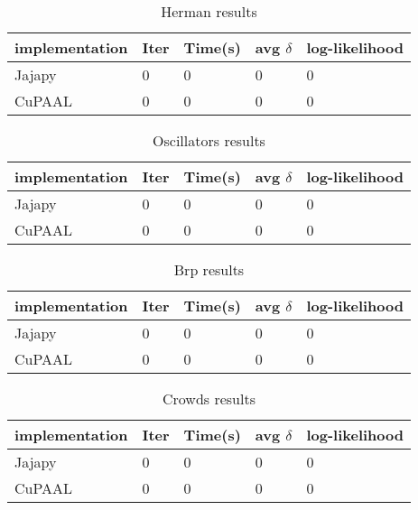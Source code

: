 \begin{table}[!htb]
    \centering
    \caption{Herman results}
    \label{tab:herman_results}
    \begin{tabular}{lllll}
        \toprule
        implementation & Iter & Time(s) & avg $\delta$ & log-likelihood \\
        \midrule
        Jajapy         & 0    & 0       & 0            & 0              \\
        CuPAAL         & 0    & 0       & 0            & 0              \\
        \bottomrule
    \end{tabular}
\end{table}

\begin{table}[!htb]
    \centering
    \caption{Oscillators results}
    \label{tab:oscillators_results}
    \begin{tabular}{lllll}
        \toprule
        implementation & Iter & Time(s) & avg $\delta$ & log-likelihood \\
        \midrule
        Jajapy         & 0    & 0       & 0            & 0              \\
        CuPAAL         & 0    & 0       & 0            & 0              \\
        \bottomrule
    \end{tabular}
\end{table}

\begin{table}[!htb]
    \centering
    \caption{Brp results}
    \label{tab:brp_results}
    \begin{tabular}{lllll}
        \toprule
        implementation & Iter & Time(s) & avg $\delta$ & log-likelihood \\
        \midrule
        Jajapy         & 0    & 0       & 0            & 0              \\
        CuPAAL         & 0    & 0       & 0            & 0              \\
        \bottomrule
    \end{tabular}
\end{table}

\begin{table}[!htb]
    \centering
    \caption{Crowds results}
    \label{tab:crowds_results}
    \begin{tabular}{lllll}
        \toprule
        implementation & Iter & Time(s) & avg $\delta$ & log-likelihood \\
        \midrule
        Jajapy         & 0    & 0       & 0            & 0              \\
        CuPAAL         & 0    & 0       & 0            & 0              \\
        \bottomrule
    \end{tabular}
\end{table}

